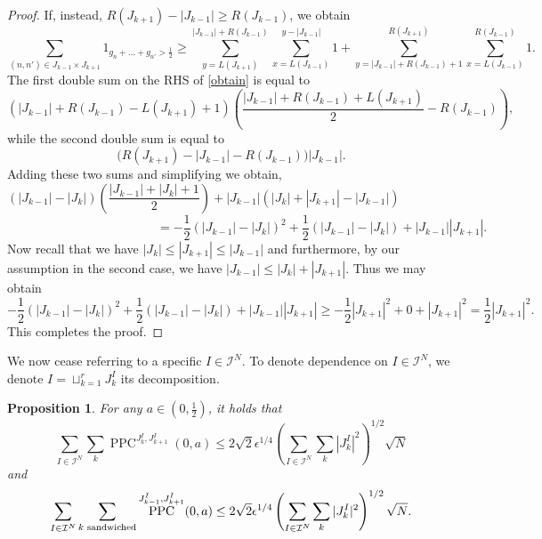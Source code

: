\documentclass[12pt]{amsart}
\newtheorem{proposition}{Proposition}[section]
\theoremstyle{definition}
\newcommand{\vs}{\vspace{3mm}}
\newcommand{\mc}{\mathcal}
\DeclareMathOperator{\PPC}{PPC}
\begin{document}
\begin{proof}
\noindent If, instead, $R(J_{k+1})-|J_{k-1}| \ge R(J_{k-1})$, we obtain \begin{equation}\label{obtain} \sum_{(n,n') \in J_{k-1}\times J_{k+1}} 1_{g_n+\dots+g_{n'} > \frac{1}{2}} \ge \sum_{y=L(J_{k+1})}^{|J_{k-1}|+R(J_{k-1})} \sum_{x=L(J_{k-1})}^{y-|J_{k-1}|} 1 +\sum_{y=|J_{k-1}|+R(J_{k-1})+1}^{R(J_{k+1})} \sum_{x=L(J_{k-1})}^{R(J_{k-1})} 1.\end{equation} The first double sum on the RHS of \eqref{obtain} is equal to $$(|J_{k-1}|+R(J_{k-1})-L(J_{k+1})+1)\left(\frac{|J_{k-1}|+R(J_{k-1})+L(J_{k+1})}{2}-R(J_{k-1})\right),$$ while the second double sum is equal to $$\Big(R(J_{k+1})-|J_{k-1}|-R(J_{k-1})\Big)|J_{k-1}|.$$ Adding these two sums and simplifying we obtain, 
$$(|J_{k-1}| - |J_k|)(\frac{|J_{k-1}| + |J_k| + 1}{2}) + |J_{k-1}|(|J_k| + |J_{k+1}|-|J_{k-1}|)\qquad \qquad \qquad$$ $$\qquad \qquad \qquad \qquad \qquad \qquad  = -\frac{1}{2}(|J_{k-1}|-|J_k|)^2 + \frac{1}{2}(|J_{k-1}| - |J_k|) + |J_{k-1}||J_{k+1}|.$$
Now recall that we have $|J_k| \leq |J_{k+1}| \leq |J_{k-1}|$ and furthermore, by our assumption in the second case, we have $|J_{k-1}| \leq |J_k| + |J_{k+1}|$. Thus we may obtain 
$$ -\frac{1}{2}(|J_{k-1}|-|J_k|)^2 + \frac{1}{2}(|J_{k-1}| - |J_k|) + |J_{k-1}||J_{k+1}| \geq -\frac{1}{2}|J_{k+1}|^2 + 0 + |J_{k+1}|^2 = \frac{1}{2}|J_{k+1}|^2.$$
This completes the proof. 
\end{proof}

\vspace{1mm}


\vspace{1mm}



\vs

We now cease referring to a specific $I \in \mc{I}^N$. To denote dependence on $I \in \mc{I}^N$, we denote $I = \sqcup_{k=1}^r J_k^I$ its decomposition. 

\vspace{1.5mm}

\begin{proposition}\label{PPCcrosstermbounds}
For any $a \in (0,\frac{1}{2})$, it holds that $$\sum_{I \in \mc{I}^N} \sum_k \PPC^{J_k^I,J_{k+1}^I}(0,a) \le 2\sqrt{2}\epsilon^{1/4}\left(\sum_{I \in \mc{I}^N} \sum_k |J_k^I|^2\right)^{1/2}\sqrt{N}$$ and $$\sum_{I \in \mc{I}^N} \sum_{k {\normalfont \text{ sandwiched}}} \PPC^{J_{k-1}^I,J_{k+1}^I}(0,a) \le 2\sqrt{2}\epsilon^{1/4}\left(\sum_{I \in \mc{I}^N} \sum_k |J_k^I|^2\right)^{1/2}\sqrt{N}.$$
\end{proposition}
\end{document}
